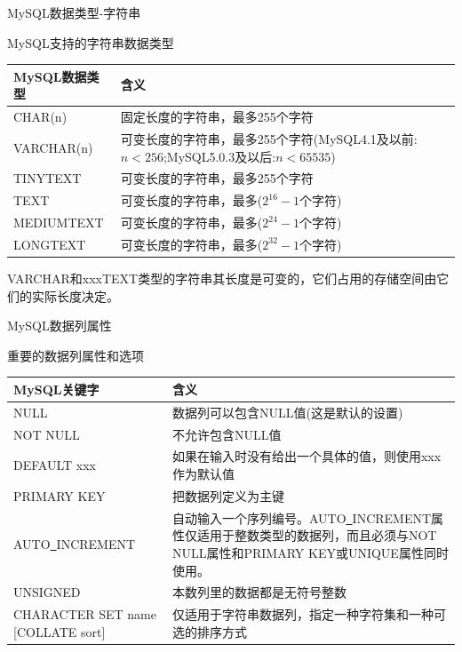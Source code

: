 \documentclass[CJK]{beamer}
\begin{document}
\begin{CJK*}{UTF8}{gbsn}
\begin{frame}{MySQL数据类型-字符串}
\begin{center}
{\tiny MySQL支持的字符串数据类型}
\end{center}
{\tiny
\begin{tabular}{l|p{8cm}}\hline
MySQL数据类型 & 含义 \\ \hline
CHAR(n) & 固定长度的字符串，最多255个字符\\ \hline
VARCHAR(n) & 可变长度的字符串，最多255个字符(MySQL4.1及以前:$n<256$;MySQL5.0.3及以后:$n<65535$)\\ \hline
TINYTEXT & 可变长度的字符串，最多255个字符\\ \hline
TEXT & 可变长度的字符串，最多($2^{16}-1$个字符)\\ \hline
MEDIUMTEXT & 可变长度的字符串，最多($2^{24}-1$个字符)\\ \hline
LONGTEXT & 可变长度的字符串，最多($2^{32}-1$个字符)\\ \hline
\end{tabular}
}
\begin{block}{}
{\small VARCHAR和xxxTEXT类型的字符串其长度是可变的，它们占用的存储空间由它们的实际长度决定。}
\end{block}
\end{frame}
\begin{frame}{MySQL数据列属性}
\begin{center}
{\tiny 重要的数据列属性和选项}
\end{center}
{\tiny
\begin{tabular}{l|p{6cm}}\hline
MySQL关键字 & 含义\\ \hline
NULL & 数据列可以包含NULL值(这是默认的设置)\\ \hline
NOT NULL & 不允许包含NULL值\\ \hline
DEFAULT xxx & 如果在输入时没有给出一个具体的值，则使用xxx作为默认值\\ \hline
PRIMARY KEY & 把数据列定义为主键\\ \hline
AUTO\underline{\ }INCREMENT & 自动输入一个序列编号。AUTO\underline{\ }INCREMENT属性仅适用于整数类型的数据列，而且必须与NOT NULL属性和PRIMARY KEY或UNIQUE属性同时使用。\\ \hline
UNSIGNED & 本数列里的数据都是无符号整数\\ \hline
CHARACTER SET name [COLLATE sort] & 仅适用于字符串数据列，指定一种字符集和一种可选的排序方式\\ \hline
\end{tabular}
}
\end{frame}


\end{CJK*}
\end{document}
